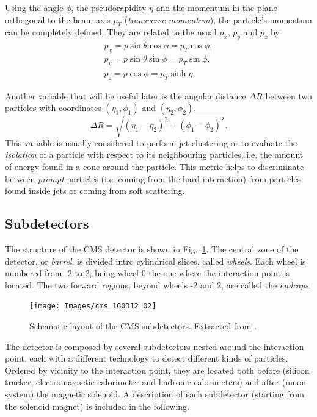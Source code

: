 \documentclass[../main.tex]{subfiles}
\begin{document}
Using the angle $\phi$, the pseudorapidity $\eta$ and the momentum in the plane orthogonal to the beam axis $p_T$ (\textit{transverse momentum}), the particle's momentum can be completely defined. They are related to the usual $p_x$, $p_y$ and $p_z$ by
\begin{align}
p_x = p\sin\theta\cos\phi = p_T \cos\phi, \\
p_y = p\sin\theta\sin\phi = p_T \sin\phi, \\
p_z = p\cos\phi = p_T \sinh \eta.
\end{align}

Another variable that will be useful later is the angular distance $\Delta R$ between two particles with coordinates $(\eta_1, \phi_1)$ and $(\eta_2, \phi_2)$,
\begin{equation}
\Delta R = \sqrt{(\eta_1 - \eta_2)^2 + (\phi_1 - \phi_2)^2}.
\end{equation}
This variable is usually considered to perform jet clustering or to evaluate the \textit{isolation} of a particle with respect to its neighbouring particles, i.e. the amount of energy found in a cone around the particle.  This metric helps to discriminate between \textit{prompt} particles (i.e. coming from the hard interaction) from particles found inside jets or coming from soft scattering.


\subsection{Subdetectors}

The structure of the CMS detector is shown in Fig.~\ref{intro:fig:subdetectors}. The central zone of the detector, or \textit{barrel}, is divided intro cylindrical slices, called \textit{wheels}. Each wheel is numbered from -2 to 2, being wheel 0 the one where the interaction point is located. The two forward regions, beyond wheels -2 and 2, are called the \textit{endcaps}.


\begin{figure}[h!]
\begin{center}
\texttt{[image: Images/cms\_160312\_02]}
\end{center}
\caption[CMS subdetectors]{Schematic layout of the CMS subdetectors. Extracted from \cite{intro:exp:subdetectors}.}
\label{intro:fig:subdetectors}
\end{figure}

The detector is composed by several subdetectors nested around the interaction point, each with a different technology to detect different kinds of particles. Ordered by vicinity to the interaction point, they are located both before (silicon tracker, electromagnetic calorimeter and hadronic calorimeters) and after (muon system) the magnetic solenoid. A description of each subdetector (starting from the solenoid magnet) is included in the following.
\end{document}
